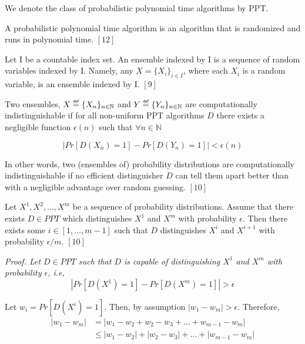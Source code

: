 \documentclass[../../main.tex]{subfiles}
\begin{document}
We denote the class of probabilistic polynomial time algorithms by PPT.

\begin{defn}
A probabilistic polynomial time algorithm is an algorithm that is randomized and runs in polynomial time. $[12]$
\end{defn}

\begin{defn}
Let I be a countable index set. An ensemble indexed by I is a sequence of random variables indexed by I. Namely, any $X = \{X_i\}_{i \in I}$, where each $X_i$ is a random variable, is an ensemble indexed by I. $[9]$
\end{defn}

\begin{defn}
Two ensembles, $X \myeq \{X_n\}_{n \in \mathbb{N}}$ and $Y \myeq \{Y_n\}_{n \in \mathbb{N}}$ are computationally indistinguishable if for all non-uniform PPT algorithms $D$ there exists a negligible function $\epsilon (n)$ such that $\forall n \in \mathbb{N}$ 

\begin{equation*}
    |Pr[D(X_n)=1]-Pr[D(Y_n)=1]|< \epsilon (n)
\end{equation*}

\noindent In other words, two (ensembles of) probability distributions are computationally indistinguishable if no efficient distinguisher $D$ can tell them apart better than with a negligible advantage over random guessing. $[10]$
\end{defn}

\begin{lemma}
Let $X^1,X^2,...,X^m$ be a sequence of probability distributions. Assume that there exists $D \in PPT$ which distinguishes $X^1$ and $X^m$ with probability $\epsilon$. Then there exists some $i \in [1,...,m-1]$ such that $D$ distinguishes $X^i$ and $X^{i+1}$ with probability $\epsilon/m$. $[10]$ 
\end{lemma}

\noindent\it{Proof}. Let $D \in PPT$ such that $D$ is capable of distinguishing $X^1$ and $X^m$ with probability $\epsilon$, i.e,
\begin{equation*}
    |Pr[D(X^1)=1]-Pr[D(X^m)=1]|> \epsilon
\end{equation*}

\noindent Let $w_i=Pr[D(X^i)=1]$. Then, by assumption $|w_1-w_m|>\epsilon$. Therefore,
\begin{equation*}
\begin{split}
    |w_1-w_m| &= |w_1 - w_2 + w_2 - w_3 + ... + w_{m-1} - w_m| \\
              &\leq |w_1-w_2|+|w_2-w_3|+...+|w_{m-1}-w_m|
\end{split}
\end{equation*}
\end{document}
